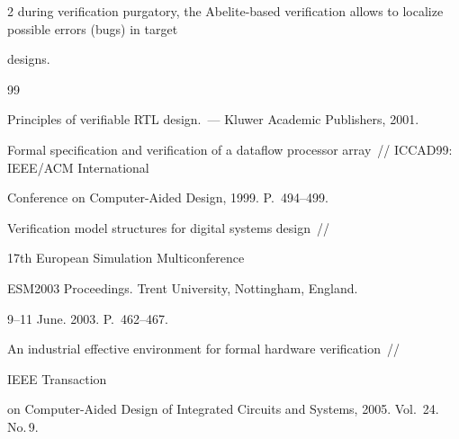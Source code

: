 \begin{multicols}{2}
during veri\-fi\-cation purgatory, the Abelite-based verification allows to localize possible errors (bugs) in target


designs.





\vspace*{-9pt}





{\small\frenchspacing


{%




\begin{thebibliography}{99}






Principles of verifiable RTL design.~---  Kluwer Academic Publishers, 2001.









Formal specification and verification of a dataflow processor array~// ICCAD99: IEEE/ACM International


Conference on Computer-Aided Design, 1999. P.~494--499.









Verification model structures for digital systems design~//


17th  European  Simulation Multiconference


ESM2003 Proceedings.   Trent University, Nottingham, England.


9--11 June. 2003. P.~462--467.









An industrial effective environment for formal hardware verification~//


IEEE Transaction


on Computer-Aided Design of Integrated Circuits and Systems, 2005. Vol.~24.  No.\,9.



\end{thebibliography}}}
\end{multicols}
